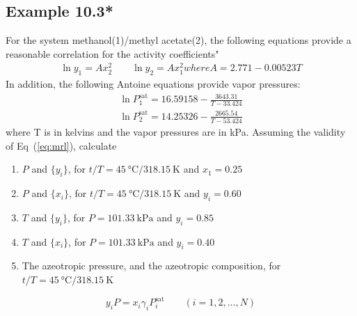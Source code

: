\documentclass[../main.tex]{subfiles}
\begin{document}
\subsection*{Example 10.3*}
%
For the system methanol(1)/methyl acetate(2), the following equations
provide a reasonable correlation for the activity coefficients"
\begin{gather*}%
  \ln y_{1} = Ax_{2}^{2} \qquad \ln y_{2} = Ax_{1}^{2} where A = 2.771
  - 0.00523 T
\end{gather*}
In addition, the following Antoine equations provide vapor pressures:
\begin{gather*}%
  \ln P_{1}^{\text{sat}} = 16.59158 - \frac{3643.31}{T - 33.424} \\
  \ln P_{2}^{\text{sat}} = 14.25326 - \frac{2665.54}{T - 53.424}
\end{gather*}
where T is in kelvins and the vapor pressures are in kPa. Assuming
the validity of Eq~(\ref{eq:mrl}), calculate
%
\begin{enumerate}[label=(\alph*)]
  \item $P$ and $\{y_{i}\}$, for $t/T =
    45~\unit{\degreeCelsius}/318.15~\unit{\kelvin}$ and $x_{1}=0.25$
  \item $P$ and $\{x_{i}\}$, for $t/T =
    45~\unit{\degreeCelsius}/318.15~\unit{\kelvin}$ and $y_{i}=0.60$
  \item $T$ and $\{y_{i}\}$, for $P = 101.33~\unit{\kilo\pascal}$ and
    $y_{i}=0.85$
  \item $T$ and $\{x_{i}\}$, for $P = 101.33~\unit{\kilo\pascal}$ and
    $y_{i}=0.40$
  \item The azeotropic pressure, and the azeotropic composition, for
    $t/T = 45~\unit{\degreeCelsius}/318.15~\unit{\kelvin}$
\end{enumerate}
%
\begin{equation}%
  y_{i}P = x_{i}\gamma_{i}P_{i}^{\text{sat}} \qquad (i = 1,2,\dots,N)
  \label{eq:mrl}
\end{equation}
%
\end{document}
